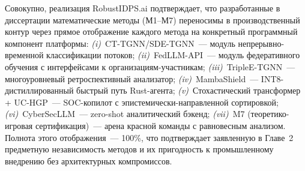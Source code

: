 Совокупно, реализация \textsf{RobustIDPS.ai} подтверждает, что разработанные в диссертации математические методы (М1--М7) переносимы в производственный контур через прямое отображение каждого метода на конкретный программный компонент платформы: \emph{(i)}~CT-TGNN/SDE-TGNN~--- модуль непрерывно-временной классификации потоков; \emph{(ii)}~FedLLM-API~--- модуль федеративного обучения с интерфейсами к организациям-участникам; \emph{(iii)}~TripleE-TGNN~--- многоуровневый ретроспективный анализатор; \emph{(iv)}~MambaShield~--- INT8-дистиллированный быстрый путь Rust-агента; \emph{(v)}~Стохастический трансформер + UC-HGP~--- SOC-копилот с эпистемически-направленной сортировкой; \emph{(vi)}~CyberSecLLM~--- zero-shot аналитический бэкенд; \emph{(vii)}~M7 (теоретико-игровая сертификация)~--- арена красной команды с равновесным анализом. Полнота этого отображения~--- 100\%, что подтверждает заявленную в Главе~2 предметную независимость методов и их пригодность к промышленному внедрению без архитектурных компромиссов.